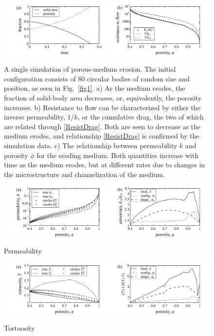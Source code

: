 \documentclass[3p]{elsarticle}
\begin{document}
\begin{figure}%
\centering \label{fig2}
\includegraphics[width = 0.99 \textwidth]{./figs/fig2.pdf}
\caption{A single simulation of porous-medium erosion. The initial configuration consists of 80 circular bodies of random size and position, as seen in Fig.~\ref{fig1}. a) As the medium erodes, the fraction of solid-body area decreases, or, equivalently, the porosity increases. b) Resistance to flow can be characterized by either the inverse permeability, $1/k$, or the cumulative drag, the two of which are related through \eqref{ResistDrag}. Both are seen to decrease as the medium erodes, and relationship \eqref{ResistDrag} is confirmed by the simulation data.
c) The relationship between permeability $k$ and porosity $\phi$ for the eroding medium. Both quantities increase with time as the medium erodes, but at different rates due to changes in the microstructure and channelization of the medium.
}
\end{figure}

\begin{figure}%
\centering \label{fig3}
\includegraphics[width = 0.99 \textwidth]{./figs/fig3.pdf}
\caption{
Permeability
}
\end{figure}


\begin{figure}%
\centering \label{fig4}
\includegraphics[width = 0.99 \textwidth]{./figs/fig4.pdf}
\caption{
Tortuosity
}
\end{figure}
\end{document}
